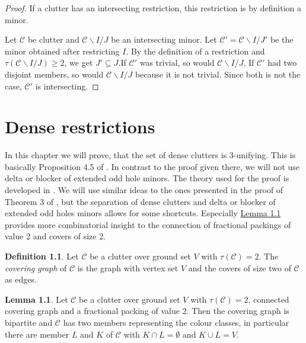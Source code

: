 \documentclass[a4paper, 12pt, twoside=false]{scrbook}
\theoremstyle{definition}
\newtheorem*{definition}{Definition}
\newtheorem{lemma}[theorem]{Lemma}
\begin{document}
  \begin{proof}
      If a clutter has an intersecting restriction, this restriction is by definition a minor.

      Let $\mathcal{C}$ be clutter and $\mathcal{C} \backslash I /J$ be an intersecting minor.
      Let $\mathcal{C'}=\mathcal{C} \backslash I /J'$ be the minor obtained after restricting $I$.
      By the definition of a restriction and $\tau(\mathcal{C} \backslash I /J) \geq 2$, we get $J' \subseteq J$.If $\mathcal{C'}$ was trivial, so would $\mathcal{C} \backslash I / J$.
      If $\mathcal{C'}$ had two disjoint members, so would $\mathcal{C} \backslash I /J$ because it is not trivial.
      Since both is not the case, $\mathcal{C'}$ is intersecting.
  \end{proof}


   \chapter{Dense restrictions}
   In this chapter we will prove, that the set of dense clutters is 3-unifying.
   This is basically Proposition 4.5 of \cite{restrictions}.
   In contrast to the proof given there, we will not use delta or blocker of extended odd hole minors.
   The theory used for the proof is developed in \cite{deltas}.
   We will use similar ideas to the ones presented in the proof of Theorem 3 of \cite{deltas}, but the separation of dense clutters and delta or blocker of extended odd holes minors allows for some shortcuts.
   Especially \hyperref[bipartite]{Lemma \ref*{bipartite}} provides more combinatorial insight to the connection of fractional packings of value 2 and covers of size 2.
   \begin{definition}
       Let $\mathcal{C}$ be a clutter over ground set $V$ with $\tau(\mathcal{C})=2$.
       The \emph{covering graph} of $\mathcal{C}$ is the graph with vertex set $V$ and the covers of size two of $\mathcal{C}$ as edges.
   \end{definition}

   \begin{lemma}\label{bipartite}
       Let $\mathcal{C}$ be a clutter over ground set $V$ with $\tau(\mathcal{C})=2$, connected covering graph and a fractional packing of value 2.
       Then the covering graph is bipartite and $\mathcal{C}$ has two members representing the colour classes, in particular there are member $L$ and $K$ of $\mathcal{C}$ with $K \cap L = \emptyset$ and $K \cup L = V$.
   \end{lemma}
\end{document}
